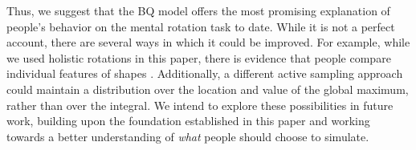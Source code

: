 \documentclass[10pt,letterpaper]{article}
\newcommand{\Bq}[0]{BQ}
\begin{document}
Thus, we suggest that the \Bq{} model offers the most promising
explanation of people's behavior on the mental rotation task to
date. While it is not a perfect account, there are several ways in
which it could be improved. For example, while we used holistic
rotations in this paper, there is evidence that people compare
individual features of shapes
\cite{Just1976,Yuille:1982tx}. Additionally, a different active
sampling approach could maintain a distribution over the location and
value of the global maximum, rather than over the integral. We intend
to explore these possibilities in future work, building upon the
foundation established in this paper and working towards a better
understanding of \textit{what} people should choose to simulate.





\renewcommand{\bibliographytypesize}{\small}
\setlength{\bibleftmargin}{.125in}
\setlength{\bibindent}{-\bibleftmargin}

\end{document}
